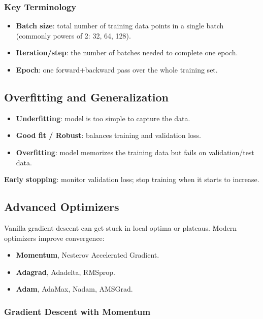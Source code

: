 \documentclass[11pt,a4paper]{article}
\begin{document}
\subsubsection{Key Terminology}

\begin{itemize}[leftmargin=*]
    \item \textbf{Batch size}: total number of training data points in a single batch (commonly powers of 2: 32, 64, 128).
    \item \textbf{Iteration/step}: the number of batches needed to complete one epoch.
    \item \textbf{Epoch}: one forward+backward pass over the whole training set.
\end{itemize}

\subsection{Overfitting and Generalization}

\begin{itemize}[leftmargin=*]
    \item \textbf{Underfitting}: model is too simple to capture the data.
    \item \textbf{Good fit / Robust}: balances training and validation loss.
    \item \textbf{Overfitting}: model memorizes the training data but fails on validation/test data.
\end{itemize}

\textbf{Early stopping}: monitor validation loss; stop training when it starts to increase.

\subsection{Advanced Optimizers}

Vanilla gradient descent can get stuck in local optima or plateaus. Modern optimizers improve convergence:
\begin{itemize}[leftmargin=*]
    \item \textbf{Momentum}, Nesterov Accelerated Gradient.
    \item \textbf{Adagrad}, Adadelta, RMSprop.
    \item \textbf{Adam}, AdaMax, Nadam, AMSGrad.
\end{itemize}

\subsubsection{Gradient Descent with Momentum}
\end{document}
